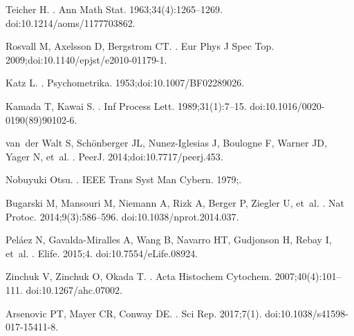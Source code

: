 \documentclass[10pt,letterpaper]{article}
\begin{document}
\begin{thebibliography}{10}
Teicher H.
.
\newblock Ann Math Stat. 1963;34(4):1265--1269.
\newblock doi:{10.1214/aoms/1177703862}.

Rosvall M, Axelsson D, Bergstrom CT.
.
\newblock Eur Phys J Spec Top. 2009;doi:{10.1140/epjst/e2010-01179-1}.

Katz L.
.
\newblock Psychometrika. 1953;doi:{10.1007/BF02289026}.

Kamada T, Kawai S.
.
\newblock Inf Process Lett. 1989;31(1):7--15.
\newblock doi:{10.1016/0020-0190(89)90102-6}.

van~der Walt S, Sch{\"{o}}nberger JL, Nunez-Iglesias J, Boulogne F, Warner JD,
  Yager N, et~al.
.
\newblock PeerJ. 2014;doi:{10.7717/peerj.453}.

{Nobuyuki Otsu}.
.
\newblock IEEE Trans Syst Man Cybern. 1979;.

Bugarski M, Mansouri M, Niemann A, Rizk A, Berger P, Ziegler U, et~al.
.
\newblock Nat Protoc. 2014;9(3):586--596.
\newblock doi:{10.1038/nprot.2014.037}.

Pel{\'{a}}ez N, Gavalda-Miralles A, Wang B, Navarro HT, Gudjonson H, Rebay I,
  et~al.
.
\newblock Elife. 2015;4.
\newblock doi:{10.7554/eLife.08924}.

Zinchuk V, Zinchuk O, Okada T.
.
\newblock Acta Histochem Cytochem. 2007;40(4):101--111.
\newblock doi:{10.1267/ahc.07002}.

Arsenovic PT, Mayer CR, Conway DE.
.
\newblock Sci Rep. 2017;7(1).
\newblock doi:{10.1038/s41598-017-15411-8}.


\end{thebibliography}
\end{document}
